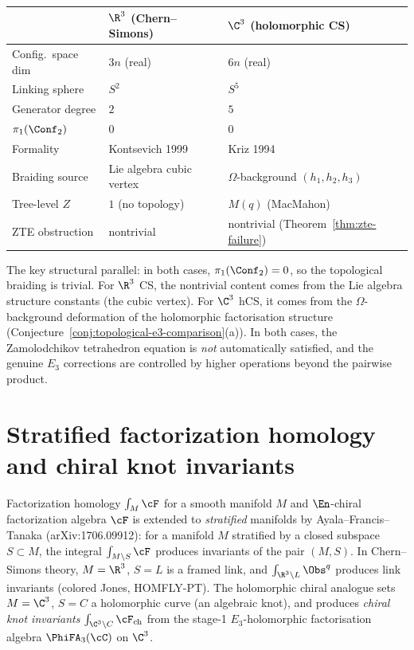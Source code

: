\begin{center}
\renewcommand{\arraystretch}{1.3}
\small
\begin{tabular}{lll}
 \toprule
 & $\R^3$ (Chern--Simons) & $\C^3$ (holomorphic CS) \\
 \midrule
 Config.\ space dim & $3n$ (real) & $6n$ (real) \\
 Linking sphere & $S^2$ & $S^5$ \\
 Generator degree & $2$ & $5$ \\
 $\pi_1(\Conf_2)$ & $0$ & $0$ \\
 Formality & Kontsevich 1999 & Kriz 1994 \\
 Braiding source & Lie algebra cubic vertex & $\Omega$-background $(h_1, h_2, h_3)$ \\
 Tree-level $Z$ & $1$ (no topology) & $M(q)$ (MacMahon) \\
 ZTE obstruction & nontrivial & nontrivial (Theorem~\ref{thm:zte-failure}) \\
 \bottomrule
\end{tabular}
\end{center}

The key structural parallel: in both cases, $\pi_1(\Conf_2) = 0$, so the topological braiding is trivial. For $\R^3$ CS, the nontrivial content comes from the Lie algebra structure constants (the cubic vertex). For $\C^3$ hCS, it comes from the $\Omega$-background deformation of the holomorphic factorisation structure (Conjecture~\ref{conj:topological-e3-comparison}(a)). In both cases, the Zamolodchikov tetrahedron equation is \emph{not} automatically satisfied, and the genuine $E_3$ corrections are controlled by higher operations beyond the pairwise product.

\section{Stratified factorization homology and chiral knot invariants}
\label{sec:stratified-fh-chiral}

Factorization homology $\int_M \cF$ for a smooth manifold $M$ and $\En$-chiral factorization algebra $\cF$ is extended to \emph{stratified} manifolds by Ayala--Francis--Tanaka (arXiv:1706.09912): for a manifold $M$ stratified by a closed subspace $S \subset M$, the integral $\int_{M \setminus S} \cF$ produces invariants of the pair $(M, S)$. In Chern--Simons theory, $M = \R^3$, $S = L$ is a framed link, and $\int_{\R^3 \setminus L} \Obs^q$ produces link invariants (colored Jones, HOMFLY-PT). The holomorphic chiral analogue sets $M = \C^3$, $S = C$ a holomorphic curve (an algebraic knot), and produces \emph{chiral knot invariants} $\int_{\C^3 \setminus C} \cF_{\mathrm{ch}}$ from the stage-1 $E_3$-holomorphic factorisation algebra $\PhiFA_3(\cC)$ on $\C^3$.


